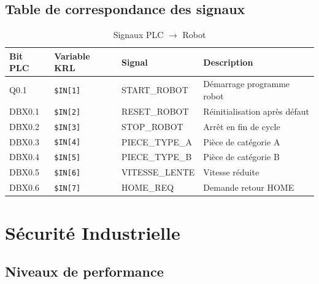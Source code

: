 \documentclass[12pt, a4paper]{report}
\begin{document}
\section{Table de correspondance des signaux}

\begin{table}[H]
  \centering
  \caption{Signaux PLC $\rightarrow$ Robot}
  \small
  \begin{tabular}{C{2.2cm} C{2.1cm} L{3.4cm} L{4cm}}
    \toprule
    \color{white}\textbf{Bit PLC} &
    \color{white}\textbf{Variable KRL} &
    \color{white}\textbf{Signal} &
    \color{white}\textbf{Description} \\
    \midrule
    Q0.1   & \texttt{\$IN[1]} & START\_ROBOT   & D\'emarrage programme robot \\
    DBX0.1 & \texttt{\$IN[2]} & RESET\_ROBOT   & R\'einitialisation apr\`es d\'efaut \\
    DBX0.2 & \texttt{\$IN[3]} & STOP\_ROBOT    & Arr\^et en fin de cycle \\
    DBX0.3 & \texttt{\$IN[4]} & PIECE\_TYPE\_A & Pi\`ece de cat\'egorie A \\
    DBX0.4 & \texttt{\$IN[5]} & PIECE\_TYPE\_B & Pi\`ece de cat\'egorie B \\
    DBX0.5 & \texttt{\$IN[6]} & VITESSE\_LENTE & Vitesse r\'eduite \\
    DBX0.6 & \texttt{\$IN[7]} & HOME\_REQ      & Demande retour HOME \\
    \bottomrule
  \end{tabular}
\end{table}
\normalsize

\chapter{S\'ecurit\'e Industrielle}
\label{chap:secu}

\section{Niveaux de performance}
\end{document}
